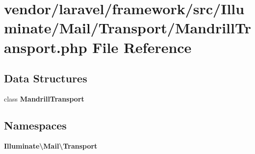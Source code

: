 \section{vendor/laravel/framework/src/\+Illuminate/\+Mail/\+Transport/\+Mandrill\+Transport.php File Reference}
\label{_mandrill_transport_8php}
\subsection*{Data Structures}
\begin{DoxyCompactItemize}
\item 
class {\bf Mandrill\+Transport}
\end{DoxyCompactItemize}
\subsection*{Namespaces}
\begin{DoxyCompactItemize}
\item 
 {\bf Illuminate\textbackslash{}\+Mail\textbackslash{}\+Transport}
\end{DoxyCompactItemize}
